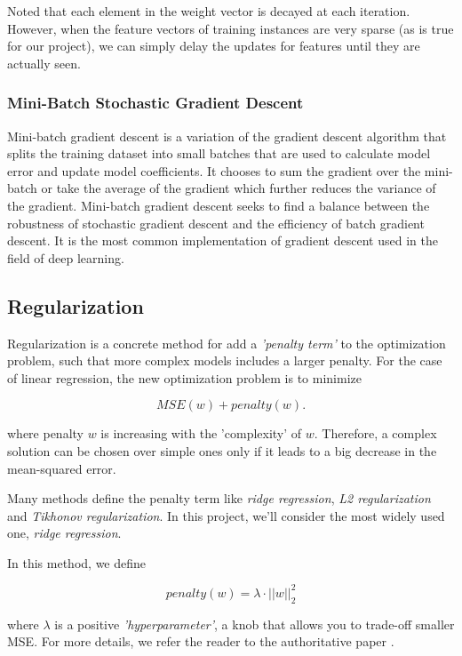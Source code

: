\documentclass[sigconf]{acmart}
\begin{document}
Noted that each element in the weight vector is decayed at each iteration. However, when the feature vectors of training instances are very sparse (as is true for our project), we can simply delay the updates for features until they are actually seen. 

\subsubsection{Mini-Batch Stochastic Gradient Descent}
\label{subsection:logisticMBSGD}

Mini-batch gradient descent is a variation of the gradient descent algorithm that splits the training dataset into small batches that are used to calculate model error and update model coefficients. It chooses to sum the gradient over the mini-batch or take the average of the gradient which further reduces the variance of the gradient. Mini-batch gradient descent seeks to find a balance between the robustness of stochastic gradient descent and the efficiency of batch gradient descent. It is the most common implementation of gradient descent used in the field of deep learning.

\subsection{Regularization}
\label{subsection:regularization}

Regularization is a concrete method for add a \textit{'penalty term'} to the optimization problem, such that more complex models includes a larger penalty. For the case of linear regression, the new optimization problem is to minimize

$$
MSE(w) + penalty(w).
$$

where penalty $w$ is increasing with the 'complexity' of $w$. Therefore, a complex solution can be chosen over simple ones only if it leads to a big decrease in the mean-squared error.

Many methods define the penalty term like \textit{ridge regression}, \textit{L2 regularization} and \textit{Tikhonov regularization}. In this project, we'll consider the most widely used one, \textit{ridge regression}.

In this method, we define

$$
penalty(w) = \lambda \cdot ||w||^2_2
$$

where $\lambda$ is a positive \textit{'hyperparameter'}, a knob that allows you to trade-off smaller MSE. For more details, we refer the reader to the authoritative paper \cite{nasrabadi2007pattern}. 
\end{document}
